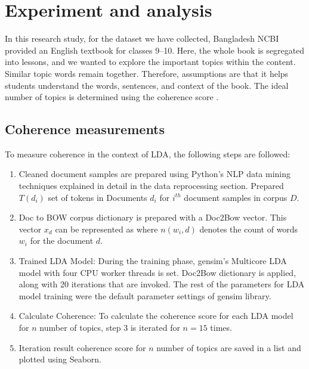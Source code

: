 \documentclass[sn-mathphys,Numbered]{sn-jnl}%
\theoremstyle{thmstyleone}%
\theoremstyle{thmstyletwo}%
\theoremstyle{thmstylethree}%
\begin{document}
\section{Experiment and analysis}\label{exp_analysis} In this research study, for the dataset we have collected, Bangladesh NCBI provided an English textbook for classes 9–10. Here, the whole book is segregated into lessons, and we wanted to explore the important topics within the content. Similar topic words remain together. Therefore, assumptions are that it helps students understand the words, sentences, and context of the book. The ideal number of topics is determined using the coherence score \cite{mimno2011optimizing}. \\

\subsection{Coherence measurements}\label{coh_measure} To measure coherence in the context of LDA, the following steps are followed: 

\begin{enumerate}[label=(\roman*)] 
\item Cleaned document samples are prepared using Python's NLP data mining techniques explained in detail in the data reprocessing section. Prepared \(T\left( d_{i} \right)\) set of tokens in Documents \(d_{i}\) for \(i^{th}\) document samples in corpus \(D\). 
\item Doc to BOW corpus dictionary is prepared with a Doc2Bow vector. This vector \(x_{d}\) can be represented as where \(n\left( w_{i},d \right)\) denotes the count of words \(w_{i}\) for the document \(d\). 
\item Trained LDA Model: During the training phase, gensim's Multicore LDA model with four CPU worker threads is set. Doc2Bow dictionary is applied, along with 20 iterations that are invoked. The rest of the parameters for LDA model training were the default parameter settings of gensim library. 
\item Calculate Coherence: To calculate the coherence score for each LDA model for \(n\) number of topics, step 3 is iterated for \(n = 15\) times. 
\item Iteration result coherence score for \(n\) number of topics are saved in a list and plotted using Seaborn. 
\end{enumerate} 
\end{document}
